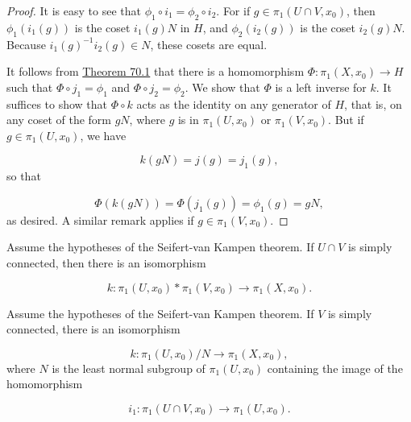 \begin{proof}
It is easy to see that \({\phi }_{1} \circ {i}_{1} = {\phi }_{2} \circ {i}_{2}\). For if \(g \in {\pi }_{1}( {U \cap V,x_{0}})\), then \({\phi }_{1}( {i_{1}( g) })\) is the coset \(i_{1}( g) N\) in \(H\), and \({\phi }_{2}( {i_{2}( g) })\) is the coset \(i_{2}( g) N\). Because \(i_{1}{( g) }^{-1}i_{2}( g) \in N\), these cosets are equal.

It follows from \hyperref[thm:70.1]{Theorem 70.1} that there is a homomorphism \(\Phi : {\pi }_{1}( {X,x_{0}}) \rightarrow H\) such that \(\Phi \circ {j}_{1} = {\phi }_{1}\) and \(\Phi \circ {j}_{2} = {\phi }_{2}\). We show that \(\Phi\) is a left inverse for \(k\). It suffices to show that \(\Phi \circ k\) acts as the identity on any generator of \(H\), that is, on any coset of the form \({gN}\), where \(g\) is in \({\pi }_{1}( {U,x_{0}})\) or \({\pi }_{1}( {V,x_{0}})\). But if \(g \in {\pi }_{1}( {U,x_{0}})\), we have

\[
k( {gN}) = j( g) = j_{1}( g),
\]
so that

\[
\Phi ( {k( {gN}) }) = \Phi ( {j_{1}( g) }) = {\phi }_{1}( g) = {gN},
\]
as desired. A similar remark applies if \(g \in {\pi }_{1}( {V,x_{0}})\).
\end{proof}
\begin{corollary}
\label{cor:\thetheorem}
Assume the hypotheses of the Seifert-van Kampen theorem. If \(U \cap V\) is simply connected, then there is an isomorphism

\[
k : {\pi }_{1}( {U,x_{0}}) * {\pi }_{1}( {V,x_{0}}) \rightarrow {\pi }_{1}( {X,x_{0}}).
\]
\end{corollary}

\begin{corollary}
\label{cor:\thetheorem}
Assume the hypotheses of the Seifert-van Kampen theorem. If \(V\) is simply connected, there is an isomorphism

\[
k : {\pi }_{1}( {U,x_{0}}) /N \rightarrow {\pi }_{1}( {X,x_{0}}),
\]
where \(N\) is the least normal subgroup of \({\pi }_{1}( {U,x_{0}})\) containing the image of the homomorphism

\[
i_{1} : {\pi }_{1}( {U \cap V,x_{0}}) \rightarrow {\pi }_{1}( {U,x_{0}}).
\]
\end{corollary}


